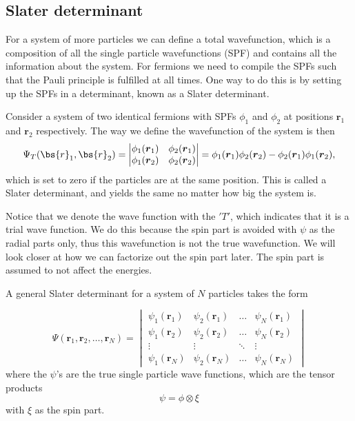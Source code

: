 \subsection{Slater determinant} \label{subsubsec:slater}
For a system of more particles we can define a total wavefunction, which is a composition of all the single particle wavefunctions (SPF) and contains all the information about the system. For fermions we need to compile the SPFs such that the Pauli principle is fulfilled at all times. One way to do this is by setting up the SPFs in a determinant, known as a Slater determinant.

Consider a system of two identical fermions with SPFs $\phi_1$ and $\phi_2$ at positions $\boldsymbol{r}_1$ and $\boldsymbol{r}_2$ respectively. The way we define the wavefunction of the system is then
\begin{equation}
\Psi_T(\bs{r}_1,\bs{r}_2)=
\begin{vmatrix}
\phi_1(\boldsymbol{r}_1) & \phi_2(\boldsymbol{r}_1)\\
\phi_1(\boldsymbol{r}_2) & \phi_2(\boldsymbol{r}_2)
\end{vmatrix}
=\phi_1(\boldsymbol{r}_1)\phi_2(\boldsymbol{r}_2)-\phi_2(\boldsymbol{r}_1)\phi_1(\boldsymbol{r}_2),
\end{equation}
which is set to zero if the particles are at the same position. This is called a Slater determinant, and yields the same no matter how big the system is.

Notice that we denote the wave function with the $'T'$, which indicates that it is a trial wave function. We do this because the spin part is avoided with $\psi$ as the radial parts only, thus this wavefunction is not the true wavefunction. We will look closer at how we can factorize out the spin part later. The spin part is assumed to not affect the energies.

A general Slater determinant for a system of $N$ particles takes the form

\begin{equation}
\Psi(\boldsymbol{r}_1,\boldsymbol{r}_2,\hdots,\boldsymbol{r}_N)=
\begin{vmatrix}
\psi_1(\boldsymbol{r}_1) & \psi_2(\boldsymbol{r}_1) & \hdots & \psi_N(\boldsymbol{r}_1)\\
\psi_1(\boldsymbol{r}_2) & \psi_2(\boldsymbol{r}_2) & \hdots & \psi_N(\boldsymbol{r}_2)\\
\vdots & \vdots & \ddots & \vdots \\
\psi_1(\boldsymbol{r}_N) & \psi_2(\boldsymbol{r}_N) & \hdots & \psi_N(\boldsymbol{r}_N)
\end{vmatrix}
\end{equation}
where the $\psi$'s are the true single particle wave functions, which are the tensor products 
\begin{equation}
\psi=\phi\otimes\xi
\end{equation}
with $\xi$ as the spin part. 

